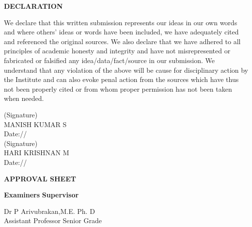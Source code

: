 \documentclass[10pt,openany]{report}
\begin{document}
\newpage
\begin{center}
\Huge \textbf{DECLARATION}
\end{center}
\vspace{1.0cm}
\linespread{1.5}
\large{
We declare that this written submission represents our ideas in our own words and where others' ideas
or words have been included, we have adequately cited and referenced the original sources. We also
declare that we have adhered to all principles of academic honesty and integrity and have not
misrepresented or fabricated or falsified any idea/data/fact/source in our submission. We understand
that any violation of the above will be cause for disciplinary action by the Institute and can also evoke
penal action from the sources which have thus not been properly cited or from whom proper permission
has not been taken when needed.}
\vspace{2.0cm}
\begin{flushright}
(Signature)\\
\large{MANISH KUMAR S}\\
\large{Date:\hspace*{1.0cm}/\hspace*{1.0cm}/}\\[2.0cm]
(Signature)\\
\large{HARI KRISHNAN M}\\
\large{Date:\hspace*{1.0cm}/\hspace*{1.0cm}/}\\[2.0cm]

\end{flushright}
\newpage
\newpage
\begin{center}
\Huge\textbf{APPROVAL SHEET}\\
\vspace{1.0cm}
\end{center}
\linespread{1.5}
\vspace{4.0cm}
\begin{flushleft}
\Large \textbf{Examiners} \hfill \Large \textbf{Supervisor}\\
\end{flushleft}
\begin{flushright}
Dr P Arivubrakan,M.E. Ph. D \\
Assistant Professor Senior Grade
\end{flushright}
\end{document}
